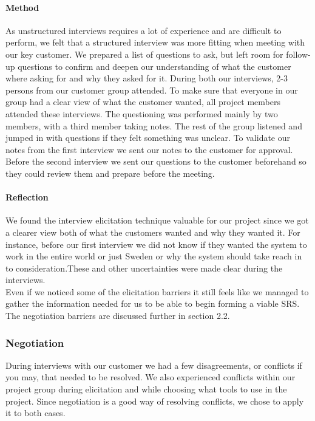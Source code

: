 \documentclass[10pt]{article}
\begin{document}
\paragraph{Method}
\hfill \break
As unstructured interviews requires a lot of experience and are difficult to perform, we felt that a structured interview was more fitting when meeting with our key customer. We prepared a list of questions to ask, but left room for follow-up questions to confirm and deepen our understanding of what the customer where asking for and why they asked for it. During both our interviews, 2-3 persons from our customer group attended. To make sure that everyone in our group had a clear view of what the customer wanted, all project members attended these interviews. The questioning was performed mainly by two members, with a third member taking notes. The rest of the group listened and jumped in with questions if they felt something was unclear. To validate our notes from the first interview we sent our notes to the customer for approval. Before the second interview we sent our questions to the customer beforehand so they could review them and prepare before the meeting.

\paragraph{Reflection}
\hfill \break
We found the interview elicitation technique valuable for our project since we got a clearer view both of what the customers wanted and why they wanted it. For instance, before our first interview we did not know  if they wanted the system to work in the entire world or just Sweden or why the system should take reach in to consideration.These and other uncertainties were made clear during the interviews. \\
\indent Even if we noticed some of the elicitation barriers it still feels like we managed to gather the information needed for us to be able to begin forming a viable SRS. The negotiation barriers are discussed further in section 2.2.  

\subsubsection{Negotiation}
During interviews with our customer we had a few disagreements, or conflicts if you may, that needed to be resolved. We also experienced conflicts within our project group during elicitation and while choosing what tools to use in the project. Since negotiation is a good way of resolving conflicts, we chose to apply it to both cases.
\end{document}
